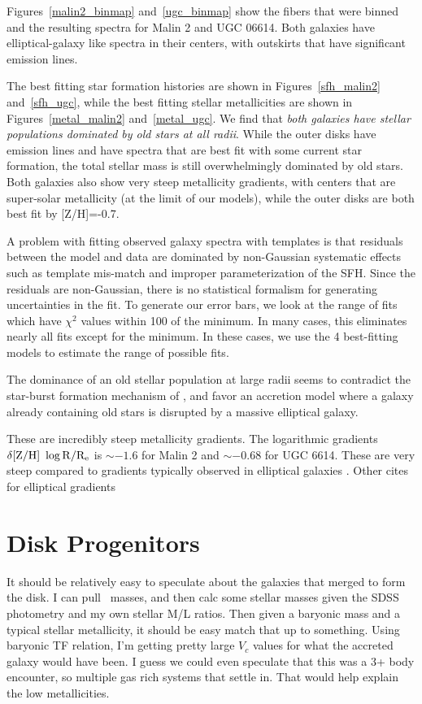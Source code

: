 \documentclass{emulateapj}
\newcommand\HI{\ion{H}{1}}
\begin{document}
Figures~\ref{malin2_binmap} and~\ref{ugc_binmap} show the fibers that were binned and the resulting spectra for Malin 2 and UGC 06614.  Both galaxies have elliptical-galaxy like spectra in their centers, with outskirts that have significant emission lines.  


The best fitting star formation histories are shown in Figures~\ref{sfh_malin2} and~\ref{sfh_ugc}, while the best fitting stellar metallicities are shown in Figures~\ref{metal_malin2} and~\ref{metal_ugc}.  We find that {\emph{both galaxies have stellar populations dominated by old stars at all radii}}.  While the outer disks have emission lines and have spectra that are best fit with some current star formation, the total stellar mass is still overwhelmingly dominated by old stars.  Both galaxies also show very steep metallicity gradients, with centers that are super-solar metallicity (at the limit of our models), while the outer disks are both best fit by [Z/H]=-0.7.  

A problem with fitting observed galaxy spectra with templates is that residuals between the model and data are dominated by non-Gaussian systematic effects such as template mis-match and improper parameterization of the SFH.  Since the residuals are non-Gaussian, there is no statistical formalism for generating uncertainties in the fit.  To generate our error bars, we look at the range of fits which have $\chi^2$ values within 100 of the minimum.  In many cases, this eliminates nearly all fits except for the minimum.  In these cases, we use the 4 best-fitting models to estimate the range of possible fits.  

The dominance of an old stellar population at large radii seems to contradict the star-burst formation mechanism of \citet{Mapelli08}, and favor an accretion model where a galaxy already containing old stars is disrupted by a massive elliptical galaxy.  


These are incredibly steep metallicity gradients.  The logarithmic gradients $\delta \rm{[Z/H]}\ \log{R/R_e}$ is $\sim -1.6$ for Malin 2 and $\sim -0.68$ for UGC 6614.  These are very steep compared to gradients typically observed in elliptical galaxies \citep{Greene12, Greene15}.  Other cites for elliptical gradients \citep{Kuntschner10}

\section{Disk Progenitors}

It should be relatively easy to speculate about the galaxies that merged to form the disk. I can pull \HI\ masses, and then calc some stellar masses given the SDSS photometry and my own stellar M/L ratios.  Then given a baryonic mass and a typical stellar metallicity, it should be easy match that up to something.  Using baryonic TF relation, I'm getting pretty large $V_c$ values for what the accreted galaxy would have been.  I guess we could even speculate that this was a 3+ body encounter, so multiple gas rich systems that settle in.  That would help explain the low metallicities.  
\end{document}

